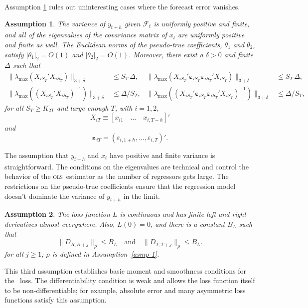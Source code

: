 \documentclass[11pt]{article}
\newtheorem{asmp}{Assumption}
\newcommand{\h}{h}
\newcommand{\ep}[1]{\ensuremath{\boldsymbol{\varepsilon}_{#1}}}
\newcommand{\ols}{\textsc{ols}}
\begin{document}
Assumption \ref{asmp-2} rules out uninteresting cases where the
forecast error vanishes.
\begin{asmp}\label{asmp-2}
  The variance of $y_{t+\h}$ given $\mathcal{F}_t$ is uniformly
  positive and finite, and all of the eigenvalues of the covariance
  matrix of $x_t$ are uniformly positive and finite as well.  The
  Euclidean norms of the pseudo-true coefficients, $\theta_1$ and
  $\theta_2$, satisfy $|\theta_1|_2 = O(1)$ and $|\theta_2|_2 = O(1)$.
  Moreover, there exist a $\delta > 0$ and finite $\Delta$ such that
  \begin{align*}
    \lVert \lambda_{\max}(X_{iS_{T}}'X_{iS_{T}}) \rVert_{3+\delta}
    &\leq S_{T}\, \Delta, &
    \lVert
    \lambda_{\max}(X_{iS_{T}}'\ep{iS_{T}}\ep{iS_{T}}'X_{iS_{T}})
    \rVert_{3+\delta} &\leq S_{T}\, \Delta, \\
    \lVert \lambda_{\max}((X_{iS_{T}}'X_{iS_{T}})^{-1}) \rVert_{3+\delta} &\leq \Delta/S_{T}, &
    \lVert
    \lambda_{\max}((X_{iS_{T}}'\ep{iS_{T}}\ep{iS_{T}}'X_{iS_{T}})^{-1})\rVert_{3+\delta}
    &\leq \Delta/S_{T},
  \end{align*}
  for all $S_{T} \geq K_{2T}$ and large enough $T$, with $i =
  1,2$,
  \[ X_{iT} \equiv [x_{i1} \quad \dots \quad x_{i,T-\h}]' \]
  and
  \[ \ep{iT} = (\varepsilon_{i,1+\h}, \dots, \varepsilon_{i,T})'.\]
\end{asmp}

The assumption that $y_{t+\h}$ and $x_t$ have positive and finite
variance is straightforward.  The conditions on the eigenvalues are
technical and control the behavior of the \ols\ estimator as the
number of regressors gets large.  The restrictions on the pseudo-true
coefficients ensure that the regression model doesn't dominate the
variance of $y_{t+\h}$ in the limit.  

\begin{asmp}\label{asmp-3}
  The loss function $L$ is continuous and has finite left and right
  derivatives almost everywhere.  Also, $L(0) = 0$, and there is a
  constant $B_L$ such that
  \begin{equation*}
    \|D_{R,R+j}\|_\rho \leq B_L \quad\text{and}\quad
    \|D_{T,T+j}\|_\rho \leq B_L.
  \end{equation*}
  for all $j \geq 1$; $\rho$ is defined in Assumption~\ref{asmp-1}.
\end{asmp}

This third assumption establishes basic moment and smoothness
conditions for the \oos\ loss.  The differentiability
condition is weak and allows the loss function itself to be
non-differentiable; for example, absolute error and many asymmetric loss functions
satisfy this assumption.
\end{document}
